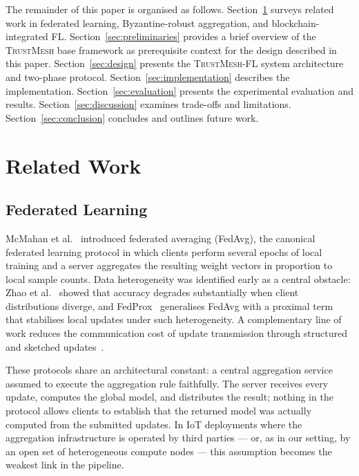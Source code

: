 \documentclass[lettersize,journal]{IEEEtran}
\newcommand{\tmfl}{\textsc{TrustMesh-FL}}
\newcommand{\tm}{\textsc{TrustMesh}}
\begin{document}
The remainder of this paper is organised as follows.
Section~\ref{sec:related} surveys related work in federated learning, Byzantine-robust
aggregation, and blockchain-integrated FL.
Section~\ref{sec:preliminaries} provides a brief overview of the \tm{} base framework
as prerequisite context for the design described in this paper.
Section~\ref{sec:design} presents the \tmfl{} system architecture and two-phase protocol.
Section~\ref{sec:implementation} describes the implementation.
Section~\ref{sec:evaluation} presents the experimental evaluation and results.
Section~\ref{sec:discussion} examines trade-offs and limitations.
Section~\ref{sec:conclusion} concludes and outlines future work.

\section{Related Work}
\label{sec:related}

\subsection{Federated Learning}

McMahan et al.~\cite{mcmahan2017communication} introduced federated averaging (FedAvg),
the canonical federated learning protocol in which clients perform several epochs of
local training and a server aggregates the resulting weight vectors in proportion to
local sample counts. Data heterogeneity was identified early as a central obstacle:
Zhao et al.~\cite{zhao2018federated} showed that accuracy degrades substantially when
client distributions diverge, and FedProx~\cite{li2020federated} generalises FedAvg with
a proximal term that stabilises local updates under such heterogeneity. A complementary
line of work reduces the communication cost of update transmission through structured
and sketched updates~\cite{konecny2016federated}.

These protocols share an architectural constant: a central aggregation service assumed
to execute the aggregation rule faithfully. The server receives every update, computes
the global model, and distributes the result; nothing in the protocol allows clients to
establish that the returned model was actually computed from the submitted updates. In
IoT deployments where the aggregation infrastructure is operated by third parties --- or,
as in our setting, by an open set of heterogeneous compute nodes --- this assumption
becomes the weakest link in the pipeline.
\end{document}
